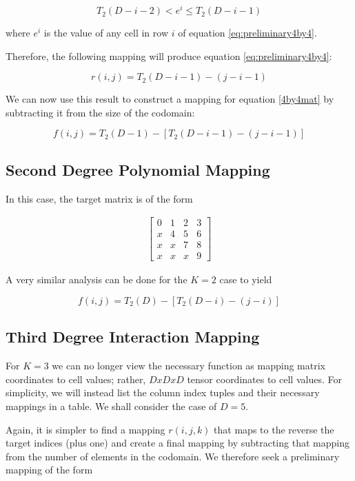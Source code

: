 \documentclass[journal]{journal}
\begin{document}
\begin{equation}
T_2(D-i-2) < e^i \le T_2(D-i-1)
\end{equation}

where $e^i$ is the value of any cell in row $i$ of equation \ref{eq:preliminary4by4}.

Therefore, the following mapping will produce equation \ref{eq:preliminary4by4}:

\begin{equation}
r(i, j) = T_2(D-i-1) - (j - i - 1)
\end{equation}

We can now use this result to construct a mapping for equation \ref{4by4mat} by subtracting it from the size of the codomain:

\begin{equation}
f(i, j) = T_2(D-1) - [T_2(D-i-1) - (j - i - 1)]
\end{equation}

\subsection{Second Degree Polynomial Mapping}
In this case, the target matrix is of the form

\begin{align}
\begin{bmatrix}
0 & 1 & 2 & 3 \\
x & 4 & 5 & 6 \\
x & x & 7 & 8 \\
x & x & x & 9
\end{bmatrix}
\label{eq:4by4mat}
\end{align}

A very similar analysis can be done for the $K=2$ case to yield

\begin{equation}
f(i, j) = T_2(D) - [T_2(D-i) - (j - i)]
\end{equation}

\subsection{Third Degree Interaction Mapping}
For $K=3$ we can no longer view the necessary function as mapping matrix coordinates to cell values; rather, $DxDxD$ tensor coordinates to cell values.
For simplicity, we will instead list the column index tuples and their necessary mappings in a table.
We shall consider the case of $D=5$.

Again, it is simpler to find a mapping $r(i, j, k)$ that maps to the reverse the target indices (plus one) and create a final mapping by subtracting that mapping from the number of elements in the codomain.
We therefore seek a preliminary mapping of the form
\end{document}
